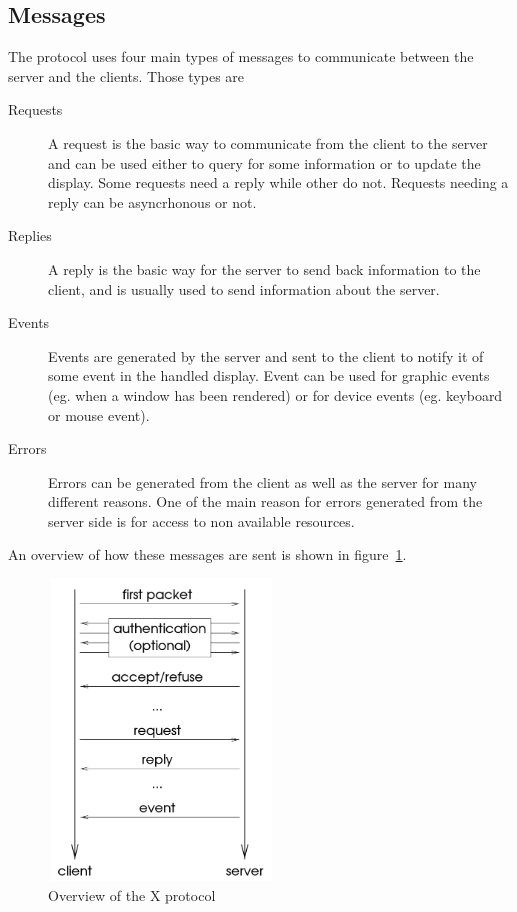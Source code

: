 \subsection{Messages}
The protocol uses four main types of messages to communicate between 
the server and the clients. Those types are
\begin{description}
\item[Requests] A request is the basic way to communicate from the client 
  to the server and can be used either to query for some information or to 
  update the display. Some requests need a reply while other do not. 
  Requests needing a reply can be asyncrhonous or not.
\item[Replies] A reply is the basic way for the server to send back
  information to the client, and is usually used to send information about the server.
\item[Events] Events are generated by the server and sent to the client to notify it of 
  some event in the handled display. Event can be used for graphic events 
  (eg. when a window has been rendered) or for device events (eg. keyboard or mouse event).
\item[Errors] Errors can be generated from the client as well as the server
  for many different reasons. One of the main reason for errors generated 
  from the server side is for access to non available resources.
\end{description}
An overview of how these messages are sent is shown in figure~\ref{fig:xcore-overview}.
\begin{figure}[tb]
  \begin{center}
    \includegraphics[height=8cm,width=6cm]{../imgs/xcore-overview.png}
    \caption{\label{fig:xcore-overview}Overview of the X protocol \protect\footnotemark}
  \end{center}
\end{figure}

